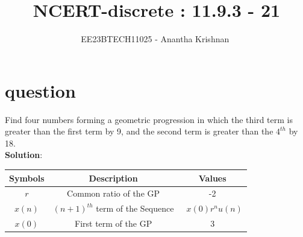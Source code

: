 \documentclass[journal,12pt,onecolumn]{IEEEtran}
\theoremstyle{remark}
\begin{document}

\vspace{3cm}

\title{NCERT-discrete : 11.9.3 - 21}
\author{EE23BTECH11025 - Anantha Krishnan $^{}$%
}
\maketitle
\bigskip

\renewcommand{\thefigure}{\theenumi}
\renewcommand{\thetable}{\theenumi}
\section{question}
Find four numbers forming a geometric progression in which the third term is greater than the first term by 9, and the second term is greater than the $4^{th}$ by 18.\\

\textbf{Solution}:
\vspace{0.5cm}
\begin{enumerate}
\begin{tabular}{ |c|c|c| } 
 \hline
Symbols & Description & Values  \\
\hline
 $r$ & Common ratio of the GP & -2\\
 \hline

  $x(n)$ & $(n+1)^{th}$ term of the Sequence & \ $x(0)r^{n}u(n)$\\
  \hline


  $x(0)$ & First term of the GP & 3\\
\hline
  
   \hline
\end{tabular}
\end{enumerate}
\centering
\captionsetup{Table 1 : Parameters , Descriptions And Values }
\label{table:ee25-tab2}
\vspace{0.5cm}
\end{document}
